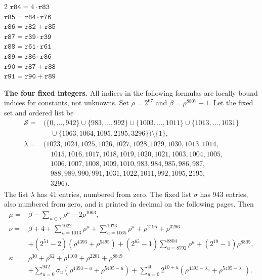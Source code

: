 \documentclass[10pt]{article}
\begin{document}
\begin{multicols}{2}
\(\mathtt{r84} = 4 \cdot \mathtt{r83}\)\\
\(\mathtt{r85} = \mathtt{r84} \cdot \mathtt{r76}\)\\
\(\mathtt{r86} = \mathtt{r82} + \mathtt{r85}\)\\
\(\mathtt{r87} = \mathtt{r39} \cdot \mathtt{r39}\)\\
\(\mathtt{r88} = \mathtt{r61} \cdot \mathtt{r61}\)\\
\(\mathtt{r89} = \mathtt{r86} \cdot \mathtt{r86}\)\\
\(\mathtt{r90} = \mathtt{r87} + \mathtt{r88}\)\\
\(\mathtt{r91} = \mathtt{r90} + \mathtt{r89}\)\\
\end{multicols}
\clearpage
\textbf{The four fixed integers.} All indices in the following formulas are
locally bound indices for constants, not unknowns. Set \(\rho=2^{67}\) and
\(\beta=\rho^{8807}-1\). Let the fixed set and ordered list be
\[
\begin{aligned}
\mathcal S={}&\bigl(\{0,\ldots,942\}\cup\{983,\ldots,992\}\cup
\{1003,\ldots,1011\}\cup\{1013,\ldots,1031\}\\
&\quad\cup\{1063,1064,1095,2195,3296\}\bigr)\setminus\{1\},\\
\lambda={}&(1023,1024,1025,1026,1027,1028,1029,1030,1013,1014,\\
&\quad 1015,1016,1017,1018,1019,1020,1021,1003,1004,1005,\\
&\quad 1006,1007,1008,1009,1010,983,984,985,986,987,\\
&\quad 988,989,990,991,1031,1022,1011,992,1095,2195,\\
&\quad 3296).
\end{aligned}
\]
The list \(\lambda\) has 41 entries, numbered from zero. The fixed list
\(\sigma\) has 943 entries, also numbered from zero, and is printed in
decimal on the following pages. Then
\[
\begin{aligned}
\mu={}&\beta-\sum_{u\in\mathcal S}\rho^u-2\rho^{1063},\\
\nu={}&\beta+4+\sum_{u=1013}^{1022}\rho^u+\sum_{u=1065}^{1073}\rho^u
 +\rho^{2195}+\rho^{3296}\\
&+(2^{51}-2)(\rho^{4393}+\rho^{5495})
 +(2^{65}-1)\sum_{u=8792}^{8804}\rho^u+(2^{19}-1)\rho^{8805},\\
\kappa={}&\rho^{30}+\rho^{62}+\rho^{1100}+\rho^{2201}+\rho^{8849}\\
&+\sum_{u=0}^{942}\sigma_u(\rho^{4393-u}+\rho^{5495-u})
 +\sum_{u=0}^{40}2^{10+u}(\rho^{4393-\lambda_u}+\rho^{5495-\lambda_u}).
\end{aligned}
\]
\end{document}
